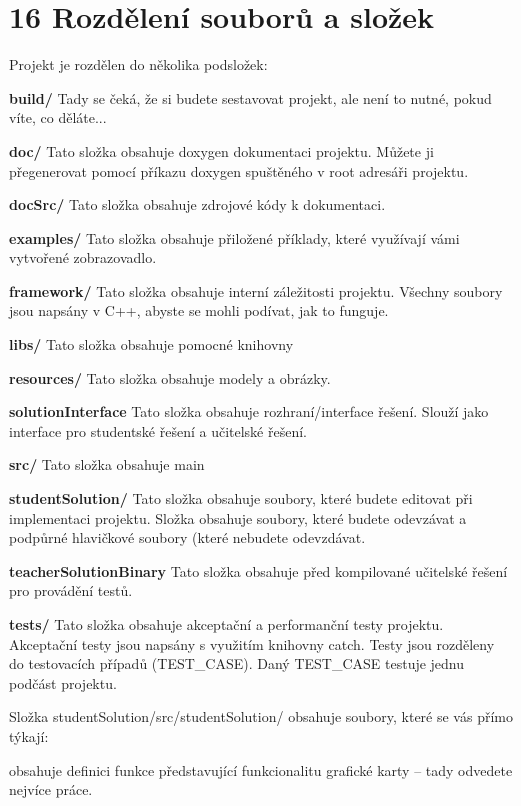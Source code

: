 \chapter{16 Rozdělení souborů a složek}
\hypertarget{p16_rozdeleni}{}\label{p16_rozdeleni}
Projekt je rozdělen do několika podsložek\+:

{\bfseries{build/}} Tady se čeká, že si budete sestavovat projekt, ale není to nutné, pokud víte, co děláte...

{\bfseries{doc/}} Tato složka obsahuje doxygen dokumentaci projektu. Můžete ji přegenerovat pomocí příkazu doxygen spuštěného v root adresáři projektu.

{\bfseries{doc\+Src/}} Tato složka obsahuje zdrojové kódy k dokumentaci.

{\bfseries{examples/}} Tato složka obsahuje přiložené příklady, které využívají vámi vytvořené zobrazovadlo.

{\bfseries{framework/}} Tato složka obsahuje interní záležitosti projektu. Všechny soubory jsou napsány v C++, abyste se mohli podívat, jak to funguje.

{\bfseries{libs/}} Tato složka obsahuje pomocné knihovny

{\bfseries{resources/}} Tato složka obsahuje modely a obrázky.

{\bfseries{solution\+Interface}} Tato složka obsahuje rozhraní/interface řešení. Slouží jako interface pro studentské řešení a učitelské řešení.

{\bfseries{src/}} Tato složka obsahuje main

{\bfseries{student\+Solution/}} Tato složka obsahuje soubory, které budete editovat při implementaci projektu. Složka obsahuje soubory, které budete odevzávat a podpůrné hlavičkové soubory (které nebudete odevzdávat.

{\bfseries{teacher\+Solution\+Binary}} Tato složka obsahuje před kompilované učitelské řešení pro provádění testů.

{\bfseries{tests/}} Tato složka obsahuje akceptační a performanční testy projektu. Akceptační testy jsou napsány s využitím knihovny catch. Testy jsou rozděleny do testovacích případů (TEST\+\_\+\+CASE). Daný TEST\+\_\+\+CASE testuje jednu podčást projektu.

Složka student\+Solution/src/student\+Solution/ obsahuje soubory, které se vás přímo týkají\+:

 obsahuje definici funkce představující funkcionalitu grafické karty  -- tady odvedete nejvíce práce.


